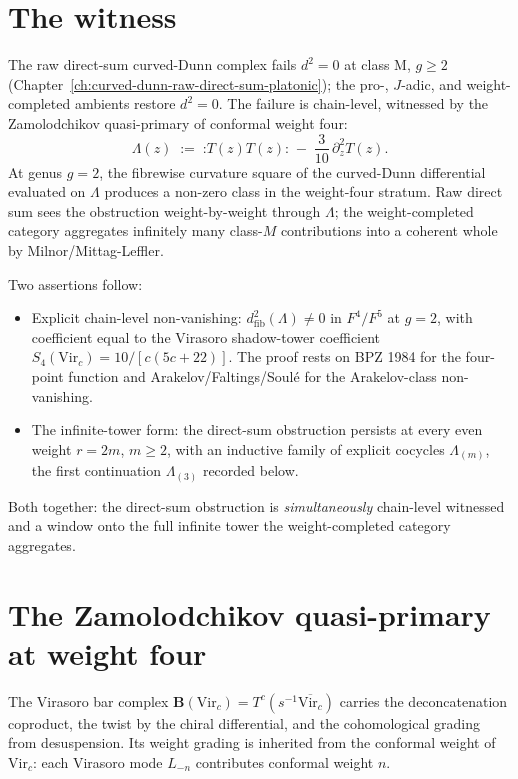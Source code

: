 \section*{The witness}

The raw direct-sum curved-Dunn complex fails \(d^{2} = 0\) at
class \(\mathrm{M}\), \(g \ge 2\)
(Chapter~\autoref{ch:curved-dunn-raw-direct-sum-platonic}); the
pro-, \(J\)-adic, and weight-completed ambients restore
\(d^{2} = 0\). The failure is chain-level, witnessed by the
Zamolodchikov quasi-primary of conformal weight four:
\[
 \Lambda(z)
 \;:=\;
 {\mathord :} T(z) T(z) {\mathord :}
 \;-\;
 \frac{3}{10}\,\partial_{z}^{2} T(z).
\]
At genus \(g = 2\), the fibrewise curvature square of the
curved-Dunn differential evaluated on \(\Lambda\) produces a
non-zero class in the weight-four stratum. Raw direct sum sees
the obstruction weight-by-weight through \(\Lambda\); the
weight-completed category aggregates infinitely many
class-\(M\) contributions into a coherent whole by
Milnor/Mittag-Leffler.

Two assertions follow:
\begin{itemize}
\item Explicit chain-level non-vanishing:
 \(d^{2}_{\mathrm{fib}}(\Lambda) \ne 0\) in
 \(F^{4} / F^{5}\) at \(g = 2\), with coefficient
 equal to the Virasoro shadow-tower coefficient
 \(S_{4}(\mathrm{Vir}_{c}) = 10 / [c(5c + 22)]\).
 The proof rests on BPZ 1984 for the four-point function and
 Arakelov/Faltings/Soul\'e for the Arakelov-class
 non-vanishing.
\item The infinite-tower form: the direct-sum
 obstruction persists at every even weight \(r = 2m\),
 \(m \ge 2\), with an inductive family of explicit cocycles
 \(\Lambda_{(m)}\), the first continuation
 \(\Lambda_{(3)}\) recorded below.
\end{itemize}
Both together: the direct-sum obstruction is
\emph{simultaneously} chain-level witnessed and a window onto
the full infinite tower the weight-completed category
aggregates.

\section{The Zamolodchikov quasi-primary at weight four}
\label{sec:zamolodchikov-quasi-primary}

The Virasoro bar complex
\(\mathbf{B}(\mathrm{Vir}_{c}) = T^{c}(s^{-1} \overline{\mathrm{Vir}_{c}})\)
carries the deconcatenation coproduct, the twist by the chiral
differential, and the cohomological grading from desuspension. Its weight
grading is inherited from the conformal weight of
\(\mathrm{Vir}_{c}\): each Virasoro mode \(L_{-n}\) contributes
conformal weight \(n\).

